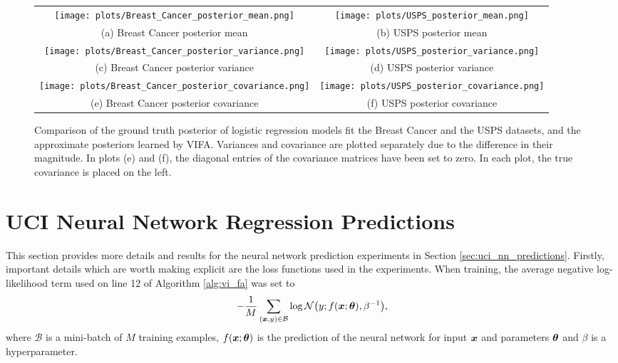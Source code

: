 \documentclass[10pt]{article} %
\begin{document}
\begin{figure}[!htbp] 
\begin{center}
	\begin{tabular}{cc}
		\texttt{[image: plots/Breast\_Cancer\_posterior\_mean.png]}
		& \texttt{[image: plots/USPS\_posterior\_mean.png]} \\
        (a) Breast Cancer posterior mean
        & (b) USPS posterior mean \\
		\texttt{[image: plots/Breast\_Cancer\_posterior\_variance.png]} 
        & \texttt{[image: plots/USPS\_posterior\_variance.png]} \\
        (c) Breast Cancer posterior variance
        & (d) USPS posterior variance \\
        \texttt{[image: plots/Breast\_Cancer\_posterior\_covariance.png]}
        & \texttt{[image: plots/USPS\_posterior\_covariance.png]} \\
        (e) Breast Cancer posterior covariance
        & (f) USPS posterior covariance
        
	\end{tabular}
	\caption{Comparison of the ground truth posterior of logistic regression models fit the Breast Cancer and the USPS datasets, and the approximate posteriors learned by VIFA. Variances and covariance are plotted separately due to the difference in their magnitude. In plots (e) and (f), the diagonal entries of the covariance matrices have been set to zero. In each plot, the true covariance is placed on the left.}
	\label{fig:posterior_breast_cancer_and_USPS}
\end{center}
\end{figure}





\section{UCI Neural Network Regression Predictions}\label{app:uci_nn_predictions}

This section provides more details and results for the neural network prediction experiments in Section \ref{sec:uci_nn_predictions}. Firstly, important details which are worth making explicit are the loss functions used in the experiments. When training, the average negative log-likelihood term used on line 12 of Algorithm \ref{alg:vi_fa} was set to
\begin{equation}\label{eqn:train_nll}
	-\frac{1}{M} \sum_{({\bm{x}}, y) \in \mathcal{B}} \log \mathcal{N}\big(y; f({\bm{x}}; {\bm{\theta}}), \beta^{-1}\big),
\end{equation}
where $\mathcal{B}$ is a mini-batch of $M$ training examples, $f({\bm{x}}; {\bm{\theta}})$ is the prediction of the neural network for input ${\bm{x}}$ and parameters ${\bm{\theta}}$ and $\beta$ is a hyperparameter. 
\end{document}
